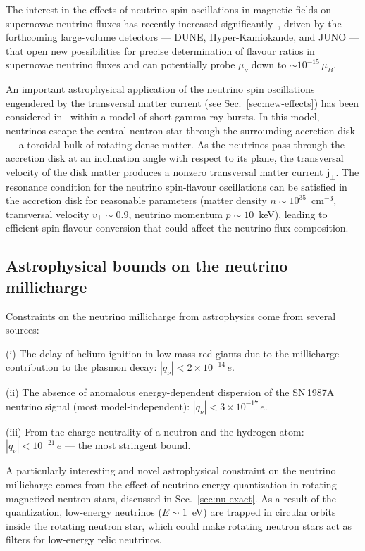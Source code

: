 \documentclass[a4paper,11pt]{article}
\begin{document}
The interest in the effects of neutrino spin oscillations in magnetic fields on supernovae neutrino fluxes has recently increased significantly~\cite{Brdar:2023PRD,Jana:Porto:2024PRL}, driven by the forthcoming large-volume detectors --- DUNE, Hyper-Kamiokande, and JUNO --- that open new possibilities for precise determination of flavour ratios in supernovae neutrino fluxes and can potentially probe $\mu_\nu$ down to $\sim 10^{-15}\,\mu_B$.

An important astrophysical application of the neutrino spin oscillations engendered by the transversal matter current (see Sec.~\ref{sec:new-effects}) has been considered in~\cite{Grigoriev:2017JCAP} within a model of short gamma-ray bursts. In this model, neutrinos escape the central neutron star through the surrounding accretion disk --- a toroidal bulk of rotating dense matter. As the neutrinos pass through the accretion disk at an inclination angle with respect to its plane, the transversal velocity of the disk matter produces a nonzero transversal matter current $\mathbf{j}_\perp$. The resonance condition for the neutrino spin-flavour oscillations can be satisfied in the accretion disk for reasonable parameters (matter density $n \sim 10^{35}$~cm$^{-3}$, transversal velocity $v_\perp \sim 0.9$, neutrino momentum $p \sim 10$~keV), leading to efficient spin-flavour conversion that could affect the neutrino flux composition.

\subsection{Astrophysical bounds on the neutrino millicharge}

Constraints on the neutrino millicharge from astrophysics come from several sources:

(i) The delay of helium ignition in low-mass red giants due to the millicharge contribution to the plasmon decay: $|q_\nu| < 2 \times 10^{-14}\,e$.

(ii) The absence of anomalous energy-dependent dispersion of the SN\,1987A neutrino signal (most model-independent): $|q_\nu| < 3 \times 10^{-17}\,e$.

(iii) From the charge neutrality of a neutron and the hydrogen atom: $|q_\nu| < 10^{-21}\,e$ --- the most stringent bound.

A particularly interesting and novel astrophysical constraint on the neutrino millicharge comes from the effect of neutrino energy quantization in rotating magnetized neutron stars, discussed in Sec.~\ref{sec:nu-exact}. As a result of the quantization, low-energy neutrinos ($E \sim 1$~eV) are trapped in circular orbits inside the rotating neutron star, which could make rotating neutron stars act as filters for low-energy relic neutrinos.
\end{document}
